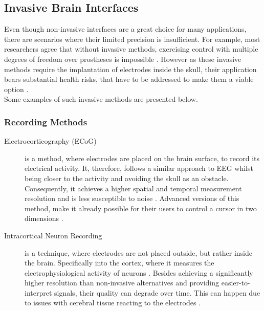     \subsection{Invasive Brain Interfaces}
        Even though non-invasive interfaces are a great choice for many applications, there are scenarios where their limited precision is insufficient. For example, most researchers agree that without invasive methods, exercising control with multiple degrees of freedom over prostheses is impossible \cite{Lebedev.2006}. However as these invasive methods require the implantation of electrodes inside the skull, their application bears substantial health risks, that have to be addressed to make them a viable option \cite{Kennedy.2000}. \\
        Some examples of such invasive methods are presented below.

        \subsubsection{Recording Methods}
        \begin{description}
            \item[Electrocorticography (ECoG)] is a method, where electrodes are placed on the brain surface, to record its electrical activity. It, therefore, follows a similar approach to EEG whilst being closer to the activity and avoiding the skull as an obstacle. Consequently, it achieves a higher spatial and temporal measurement resolution and is less susceptible to noise \cite{Ball.2009}. Advanced versions of this method, make it already possible for their users to control a cursor in two dimensions \cite{Schalk.2007}.
            \item[Intracortical Neuron Recording] is a technique, where electrodes are not placed outside, but rather inside the brain. Specifically into the cortex, where it measures the electrophysiological activity of neurons \cite{NicolasAlonso.2012}. Besides achieving a significantly higher resolution than non-invasive alternatives and providing easier-to-interpret signals, their quality can degrade over time. This can happen due to issues with cerebral tissue reacting to the electrodes \cite{Polikov.2005}.
        \end{description}
